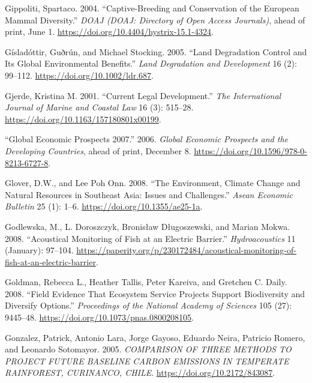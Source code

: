 \begin{CSLReferences}{1}{1}
Gippoliti, Spartaco. 2004. {``Captive-Breeding and Conservation of the
European Mammal Diversity.''} \emph{DOAJ (DOAJ: Directory of Open Access
Journals)}, ahead of print, June 1.
\url{https://doi.org/10.4404/hystrix-15.1-4324}.

Gísladóttir, Guðrún, and Michael Stocking. 2005. {``Land Degradation
Control and Its Global Environmental Benefits.''} \emph{Land Degradation
and Development} 16 (2): 99--112. \url{https://doi.org/10.1002/ldr.687}.

Gjerde, Kristina M. 2001. {``Current Legal Development.''} \emph{The
International Journal of Marine and Coastal Law} 16 (3): 515--28.
\url{https://doi.org/10.1163/157180801x00199}.

{``Global Economic Prospects 2007.''} 2006. \emph{Global Economic
Prospects and the Developing Countries}, ahead of print, December 8.
\url{https://doi.org/10.1596/978-0-8213-6727-8}.

Glover, D.W., and Lee Poh Onn. 2008. {``The Environment, Climate Change
and Natural Resources in Southeast Asia: Issues and Challenges.''}
\emph{Asean Economic Bulletin} 25 (1): 1--6.
\url{https://doi.org/10.1355/ae25-1a}.

Godlewska, M., L. Doroszczyk, Bronisław Długoszewski, and Marian Mokwa.
2008. {``Acoustical Monitoring of Fish at an Electric Barrier.''}
\emph{Hydroacoustics} 11 (January): 97--104.
\url{https://paperity.org/p/230172484/acoustical-monitoring-of-fish-at-an-electric-barrier}.

Goldman, Rebecca L., Heather Tallis, Peter Kareiva, and Gretchen C.
Daily. 2008. {``Field Evidence That Ecosystem Service Projects Support
Biodiversity and Diversify Options.''} \emph{Proceedings of the National
Academy of Sciences} 105 (27): 9445--48.
\url{https://doi.org/10.1073/pnas.0800208105}.

Gonzalez, Patrick, Antonio Lara, Jorge Gayoso, Eduardo Neira, Patricio
Romero, and Leonardo Sotomayor. 2005. \emph{COMPARISON OF THREE METHODS
TO PROJECT FUTURE BASELINE CARBON EMISSIONS IN TEMPERATE RAINFOREST,
CURINANCO, CHILE}. \url{https://doi.org/10.2172/843087}.


\end{CSLReferences}
